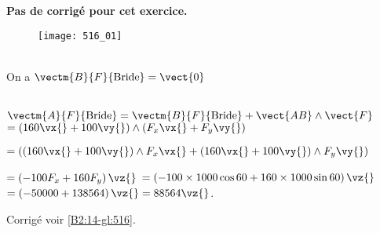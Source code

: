 \normaltrue \difficilefalse \tdifficilefalse
\correctiontrue 


\setcounter{numques}{0}
\ifcorrection
\else
\textbf{Pas de corrigé pour cet exercice.}
\fi

\ifprof
\else


\begin{figure}[H]
\centering
\texttt{[image: 516\_01]}
\end{figure}
\fi


\ifprof ~\\
On a $\vectm{B}{F}{\text{Bride}} = \vect{0}$
\else
\fi

\ifprof ~\\
$\vectm{A}{F}{\text{Bride}}=\vectm{B}{F}{\text{Bride}} + \vect{AB}\wedge \vect{F} $ 
$=\left(160 \vx{} + 100 \vy{}\right) \wedge \left(F_x \vx{}+F_y \vy{} \right) $

$= \left(\left(160 \vx{} + 100 \vy{}\right) \wedge  F_x \vx{}+ \left(160 \vx{} + 100 \vy{}\right) \wedge F_y \vy{} \right) $

$= \left( -100 F_x +  160  F_y   \right)\vz{} $
$= \left( -100 \times 1000 \cos 60 +  160   \times 1000 \sin 60 \right)\vz{} $
$= \left( - 50000 +  138 564 \right)\vz{} =  88 564 \vz{} $.
\else
\fi


\ifprof
\else
\begin{flushright}
\footnotesize{Corrigé  voir \ref{B2:14-gl:516}.}
\end{flushright}%
\fi